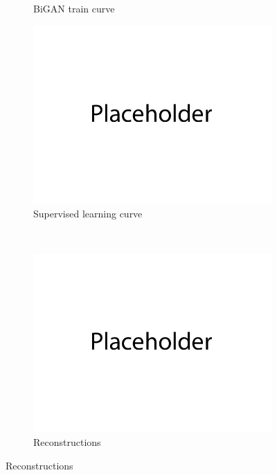 \documentclass{article}
\begin{document}
\begin{figure}[H]
\begin{subfigure}{0.45\textwidth}
        \caption{BiGAN train curve}
    \end{subfigure}
    \begin{subfigure}{0.45\textwidth}
        \centering
        \includegraphics[width=\textwidth]{figures/q3_supervised_losses.png}
        \caption{Supervised learning curve}
    \end{subfigure}
    \\
    \begin{subfigure}{0.8\textwidth}
        \centering
        \includegraphics[width=\textwidth]{figures/q3_reconstructions.png}
        \caption{Reconstructions}
    \end{subfigure}
\end{figure}
\end{document}
